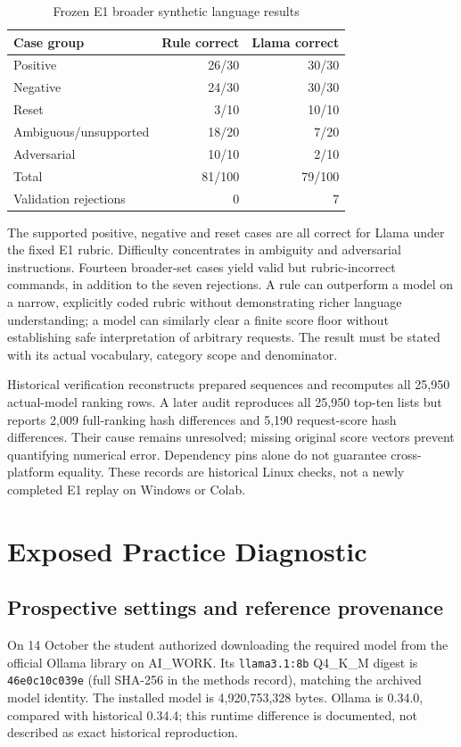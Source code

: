 \documentclass[conference]{IEEEtran}
\begin{document}
\begin{table}[t]\centering\small
\caption{Frozen E1 broader synthetic language results}
\begin{tabular}{lrr}\toprule
Case group&Rule correct&Llama correct\\\midrule
Positive&26/30&30/30\\
Negative&24/30&30/30\\
Reset&3/10&10/10\\
Ambiguous/unsupported&18/20&7/20\\
Adversarial&10/10&2/10\\\midrule
Total&81/100&79/100\\
Validation rejections&0&7\\\bottomrule
\end{tabular}\end{table}

The supported positive, negative and reset cases are all correct for Llama under the fixed E1 rubric. Difficulty concentrates in ambiguity and adversarial instructions. Fourteen broader-set cases yield valid but rubric-incorrect commands, in addition to the seven rejections. A rule can outperform a model on a narrow, explicitly coded rubric without demonstrating richer language understanding; a model can similarly clear a finite score floor without establishing safe interpretation of arbitrary requests. The result must be stated with its actual vocabulary, category scope and denominator.

Historical verification reconstructs prepared sequences and recomputes all 25,950 actual-model ranking rows. A later audit reproduces all 25,950 top-ten lists but reports 2,009 full-ranking hash differences and 5,190 request-score hash differences. Their cause remains unresolved; missing original score vectors prevent quantifying numerical error. Dependency pins alone do not guarantee cross-platform equality. These records are historical Linux checks, not a newly completed E1 replay on Windows or Colab.

\section{Exposed Practice Diagnostic}
\subsection{Prospective settings and reference provenance}
On 14 October the student authorized downloading the required model from the official Ollama library on AI\_WORK. Its \texttt{llama3.1:8b} Q4\_K\_M digest is \texttt{46e0c10c039e} (full SHA-256 in the methods record), matching the archived model identity. The installed model is 4,920,753,328 bytes. Ollama is 0.34.0, compared with historical 0.34.4; this runtime difference is documented, not described as exact historical reproduction.
\end{document}
